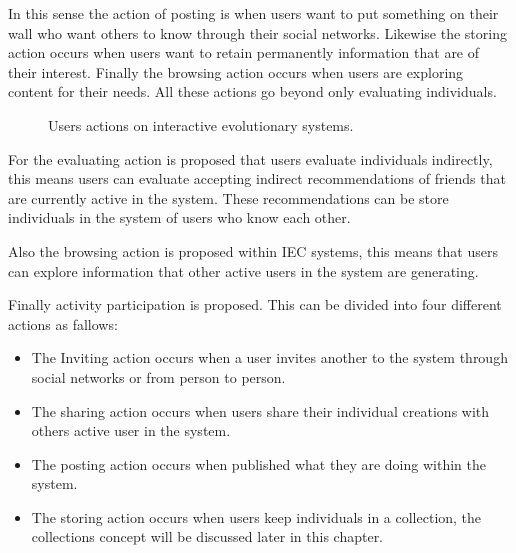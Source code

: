 


In this sense the action of posting is when
users want to put something on their wall who want others to know through
their social networks. Likewise the storing action occurs when users want to
retain permanently information that are of their interest. Finally the
browsing action occurs when users are exploring content for their needs. All
these actions go beyond only evaluating individuals.

\begin{figure}
  \captionsetup{justification=centering,margin=2cm}
  \centering
  \setlength\fboxsep{0pt}
  \setlength\fboxrule{0.7pt}
  \caption{Users actions on interactive evolutionary systems.}
  \label{fig:users}       
\end{figure}


For the evaluating action is proposed  that users evaluate individuals
indirectly, this means users can evaluate accepting indirect recommendations of
friends that are currently active in the system. These recommendations can be
store individuals in the system of users who know each other.

Also the  browsing action is proposed within IEC systems,  this means that users
can explore information that other active users in the system are generating.

Finally activity participation is proposed. This can be divided into four
different actions as fallows:

\begin{itemize} 
\item The Inviting action occurs when a user invites another to the system through social networks or from person to person.  
\item The sharing action occurs when users share their individual creations with others active user in the system.
\item The posting action occurs when published what they are doing within the system.
\item The storing action occurs when users keep individuals in a collection, the collections concept will be discussed later in this chapter.
\end{itemize}

